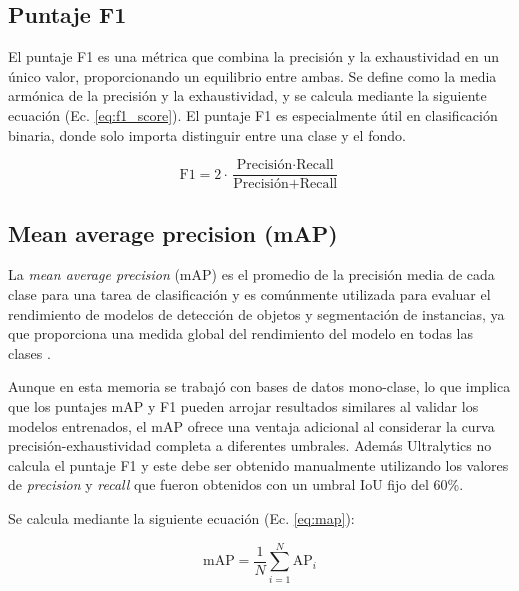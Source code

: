 

\subsection{Puntaje F1}
El puntaje F1 es una métrica que combina la precisión y la exhaustividad en un único valor, proporcionando un equilibrio entre ambas. Se define como la media armónica de la precisión y la exhaustividad, y se calcula mediante la siguiente ecuación (Ec. \ref{eq:f1_score}). El puntaje F1 es especialmente útil en clasificación binaria, donde solo importa distinguir entre una clase y el fondo.

\begin{equation}
\text{F1} = 2 \cdot \dfrac{\text{Precisión} \cdot \text{Recall}}{\text{Precisión} + \text{Recall}}
\label{eq:f1_score}
\end{equation}

\subsection{Mean average precision (mAP)}
La \textit{mean average precision} (mAP) es el promedio de la precisión media de cada clase para una tarea de clasificación y es comúnmente utilizada para evaluar el rendimiento de modelos de detección de objetos y segmentación de instancias, ya que proporciona una medida global del rendimiento del modelo en todas las clases \cite{v7labs-mAP}.

Aunque en esta memoria se trabajó con bases de datos mono-clase, lo que implica que los puntajes mAP y F1 pueden arrojar resultados similares al validar los modelos entrenados, el mAP ofrece una ventaja adicional al considerar la curva precisión-exhaustividad completa a diferentes umbrales. Además Ultralytics no calcula el puntaje F1 y este debe ser obtenido manualmente utilizando los valores de \textit{precision} y \textit{recall} que fueron obtenidos con un umbral IoU fijo del 60\%.

Se calcula mediante la siguiente ecuación (Ec. \ref{eq:map}):

\begin{equation}
\text{mAP} = \dfrac{1}{N} \sum_{i=1}^{N} \text{AP}_i
\label{eq:map}
\end{equation}

